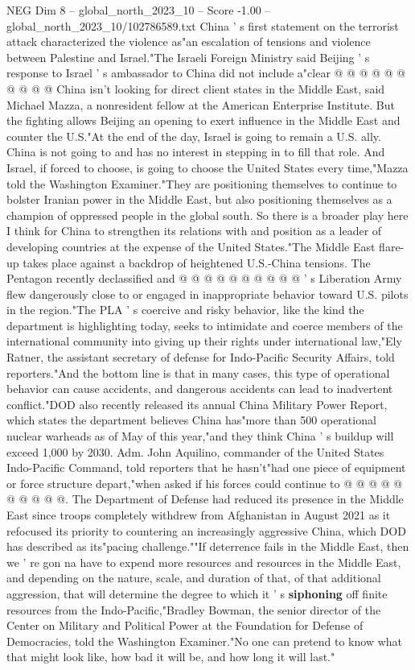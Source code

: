\begin{textsample}{NEG Dim 8 – global\_north\_2023\_10 – Score -1.00 – global\_north\_2023\_10/102786589.txt}
China ' s first statement on the terrorist attack characterized the violence as"an escalation of tensions and violence between Palestine and Israel."The Israeli Foreign Ministry said Beijing ' s response to Israel ' s ambassador to China did not include a"clear @ @ @ @ @ @ @ @ @ @ China isn't looking for direct client states in the Middle East, said Michael Mazza, a nonresident fellow at the American Enterprise Institute.
But the fighting allows Beijing an opening to exert influence in the Middle East and counter the U.S."At the end of the day, Israel is going to remain a U.S. ally.
China is not going to and has no interest in stepping in to fill that role.
And Israel, if forced to choose, is going to choose the United States every time,"Mazza told the Washington Examiner."They are positioning themselves to continue to bolster Iranian power in the Middle East, but also positioning themselves as a champion of oppressed people in the global south.
So there is a broader play here I think for China to strengthen its relations with and position as a leader of developing countries at the expense of the United States."The Middle East flare-up takes place against a backdrop of heightened U.S.-China tensions.
The Pentagon recently declassified and @ @ @ @ @ @ @ @ @ @ ' s Liberation Army flew dangerously close to or engaged in inappropriate behavior toward U.S. pilots in the region."The PLA ' s coercive and risky behavior, like the kind the department is highlighting today, seeks to intimidate and coerce members of the international community into giving up their rights under international law,"Ely Ratner, the assistant secretary of defense for Indo-Pacific Security Affairs, told reporters."And the bottom line is that in many cases, this type of operational behavior can cause accidents, and dangerous accidents can lead to inadvertent conflict."DOD also recently released its annual China Military Power Report, which states the department believes China has"more than 500 operational nuclear warheads as of May of this year,"and they think China ' s buildup will exceed 1,000 by 2030.
Adm.
John Aquilino, commander of the United States Indo-Pacific Command, told reporters that he hasn't"had one piece of equipment or force structure depart,"when asked if his forces could continue to @ @ @ @ @ @ @ @ @ @.
The Department of Defense had reduced its presence in the Middle East since troops completely withdrew from Afghanistan in August 2021 as it refocused its priority to countering an increasingly aggressive China, which DOD has described as its"pacing challenge.""If deterrence fails in the Middle East, then we ' re gon na have to expend more resources and resources in the Middle East, and depending on the nature, scale, and duration of that, of that additional aggression, that will determine the degree to which it ' s \textbf{siphoning} off finite resources from the Indo-Pacific,"Bradley Bowman, the senior director of the Center on Military and Political Power at the Foundation for Defense of Democracies, told the Washington Examiner."No one can pretend to know what that might look like, how bad it will be, and how long it will last."

\end{textsample}
